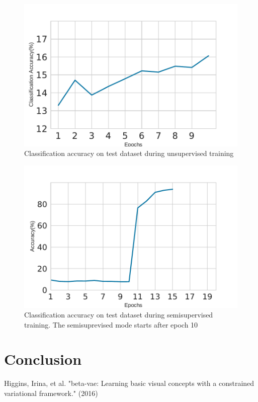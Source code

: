 \documentclass[runningheads]{llncs}
\begin{document}
\begin{figure}[]
\centering
\includegraphics[width=\linewidth]{classification_acc_unsupervised}
\caption{Classification accuracy on test dataset during unsupervised training}
\label{classification_acc_unsupervised}
\end{figure}

\begin{figure}[]
\centering
\includegraphics[width=\linewidth]{classification_acc_semi_supervised}
\caption{Classification accuracy on test dataset during semisupervised training. The semisuprevised mode starts after epoch 10}
\label{classification_acc_semi_supervised}
\end{figure}


\section{Conclusion}
%
%
%
% 
% 
%
\begin{thebibliography}{8}
    Higgins, Irina, et al. "beta-vae: Learning basic visual concepts with a constrained variational framework." (2016)
\end{thebibliography}
\end{document}
